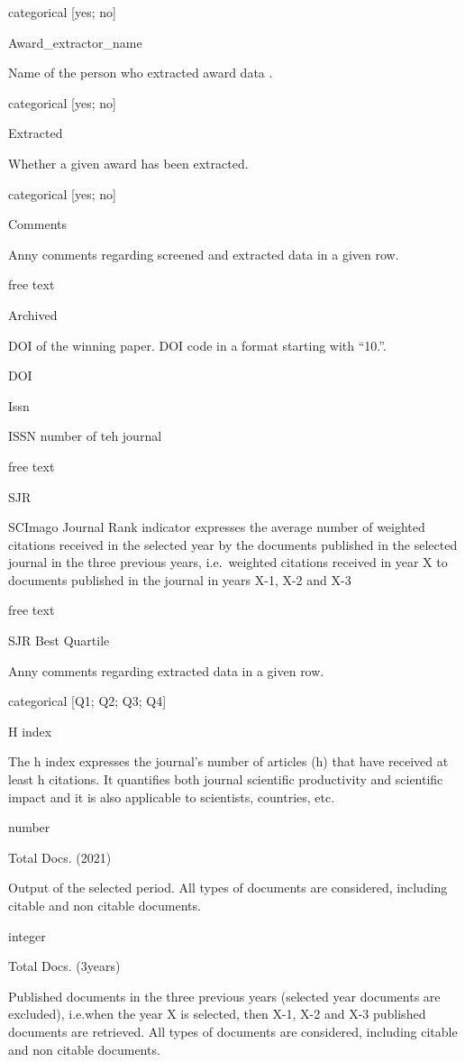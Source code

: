 \documentclass[
]{article}
\begin{document}
categorical {[}yes; no{]}

Award\_extractor\_name

Name of the person who extracted award data .

categorical {[}yes; no{]}

Extracted

Whether a given award has been extracted.

categorical {[}yes; no{]}

Comments

Anny comments regarding screened and extracted data in a given row.

free text

Archived

DOI of the winning paper. DOI code in a format starting with ``10.''.

DOI

Issn

ISSN number of teh journal

free text

SJR

SCImago Journal Rank indicator expresses the average number of weighted
citations received in the selected year by the documents published in
the selected journal in the three previous years, i.e.~weighted
citations received in year X to documents published in the journal in
years X-1, X-2 and X-3

free text

SJR Best Quartile

Anny comments regarding extracted data in a given row.

categorical {[}Q1; Q2; Q3; Q4{]}

H index

The h index expresses the journal's number of articles (h) that have
received at least h citations. It quantifies both journal scientific
productivity and scientific impact and it is also applicable to
scientists, countries, etc.

number

Total Docs. (2021)

Output of the selected period. All types of documents are considered,
including citable and non citable documents.

integer

Total Docs. (3years)

Published documents in the three previous years (selected year documents
are excluded), i.e.when the year X is selected, then X-1, X-2 and X-3
published documents are retrieved. All types of documents are
considered, including citable and non citable documents.
\end{document}
